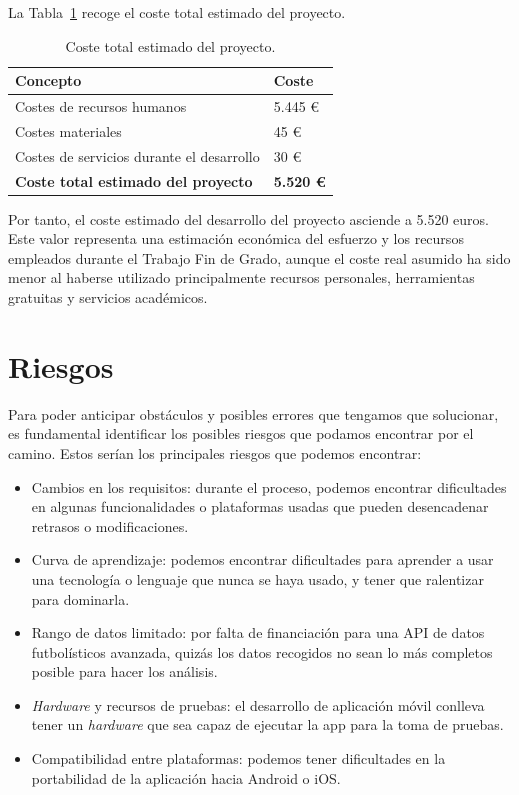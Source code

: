 La Tabla~\ref{tab:coste_total_proyecto} recoge el coste total estimado del proyecto.

\begin{table}[H]
\centering
\caption{Coste total estimado del proyecto.}
\label{tab:coste_total_proyecto}
\renewcommand{\arraystretch}{1.2}
\begin{tabular}{|p{8cm}|p{4cm}|}
\hline
\textbf{Concepto} & \textbf{Coste} \\ \hline

Costes de recursos humanos &
5.445 \euro \\ \hline

Costes materiales &
45 \euro \\ \hline

Costes de servicios durante el desarrollo &
30 \euro \\ \hline

\textbf{Coste total estimado del proyecto} &
\textbf{5.520 \euro} \\ \hline

\end{tabular}
\end{table}

Por tanto, el coste estimado del desarrollo del proyecto asciende a 5.520 euros. Este valor representa una estimación económica del esfuerzo y los recursos empleados durante el Trabajo Fin de Grado, aunque el coste real asumido ha sido menor al haberse utilizado principalmente recursos personales, herramientas gratuitas y servicios académicos.
\section{Riesgos}
Para poder anticipar obstáculos y posibles errores que tengamos que solucionar, es fundamental identificar los posibles riesgos que podamos encontrar por el camino. Estos serían los principales riesgos que podemos encontrar:
\begin{itemize}
    \item Cambios en los requisitos: durante el proceso, podemos encontrar dificultades en algunas funcionalidades o plataformas usadas que pueden desencadenar retrasos o modificaciones.
    \item Curva de aprendizaje: podemos encontrar dificultades para aprender a usar una tecnología o lenguaje que nunca se haya usado, y tener que ralentizar para dominarla.
    \item Rango de datos limitado: por falta de financiación para una API de datos futbolísticos avanzada, quizás los datos recogidos no sean lo más completos posible para hacer los análisis.
    \item \textit{Hardware} y recursos de pruebas: el desarrollo de aplicación móvil conlleva tener un \textit{hardware} que sea capaz de ejecutar la app para la toma de pruebas.
    \item Compatibilidad entre plataformas: podemos tener dificultades en la portabilidad de la aplicación hacia Android o iOS.
\end{itemize}

